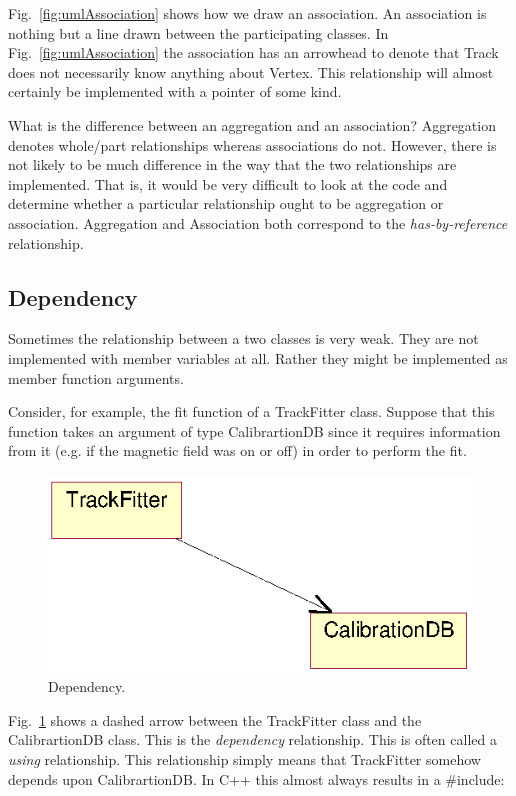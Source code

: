 \begin{Entry}
\begin{Entry}
Fig.~\ref{fig:umlAssociation} shows how we draw an association.  An
association is nothing but a line drawn between the participating
classes. In Fig.~\ref{fig:umlAssociation} the association has an
arrowhead to denote that Track does not necessarily know anything
about Vertex. This relationship will almost certainly be implemented
with a pointer of some kind.

What is the difference between an aggregation and an association?
Aggregation denotes whole/part relationships whereas associations do
not. However, there is not likely to be much difference in the way
that the two relationships are implemented.  That is, it would be very
difficult to look at the code and determine whether a particular
relationship ought to be aggregation or association.  Aggregation and
Association both correspond to the \emph{has-by-reference}
relationship.

\subsection{Dependency}

Sometimes the relationship between a two classes is very weak. They
are not implemented with member variables at all. Rather they might be
implemented as member function arguments.

Consider, for example, the fit function of a TrackFitter class.
Suppose that this function takes an argument of type CalibrartionDB
since it requires information from it (e.g. if the magnetic field was
on or off) in order to perform the fit.
\begin{figure}[htb]
    \begin{center}
        \includegraphics{umlDependency.eps}
        \caption{Dependency.}
        \label{fig:umlDependency}
    \end{center}
\end{figure}
Fig.~\ref{fig:umlDependency} shows a dashed arrow between the
TrackFitter class and the CalibrartionDB class. This is the
\emph{dependency} relationship. This is often called a \emph{using}
relationship.  This relationship simply means that TrackFitter somehow
depends upon CalibrartionDB. In C++ this almost always results in a
\#include:


\end{Entry}
\end{Entry}
